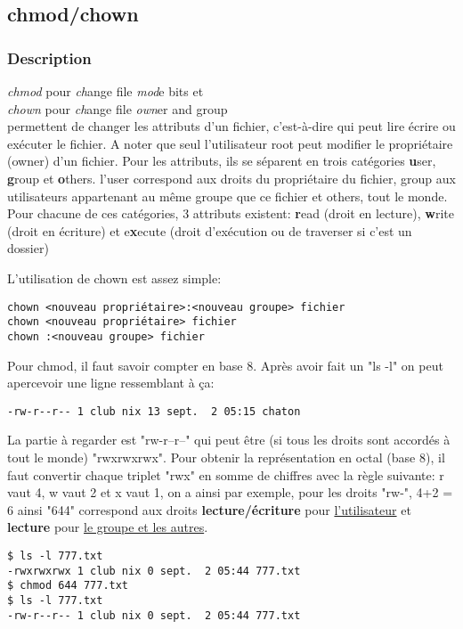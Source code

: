 \subsection*{chmod/chown}
\subsubsection*{Description}
\noindent \emph{chmod} pour \emph{ch}ange file \emph{mod}e bits et\\
\emph{chown} pour  \emph{ch}ange file \emph{own}er and group\\
permettent de changer les attributs d'un fichier, c'est-à-dire qui peut lire écrire ou exécuter le fichier.
A noter que seul l'utilisateur root peut modifier le propriétaire (owner) d'un fichier.
Pour les attributs, ils se séparent en trois catégories \textbf{u}ser, \textbf{g}roup et \textbf{o}thers.
l'user correspond aux droits du propriétaire du fichier, group aux utilisateurs appartenant au même groupe que ce fichier et others, tout le monde.\\
Pour chacune de ces catégories, 3 attributs existent: \textbf{r}ead (droit en lecture), \textbf{w}rite (droit en écriture) et e\textbf{x}ecute (droit d’exécution ou de traverser si c'est un dossier)

\noindent L'utilisation de chown est assez simple:
\begin{lstlisting}
chown <nouveau propriétaire>:<nouveau groupe> fichier
chown <nouveau propriétaire> fichier
chown :<nouveau groupe> fichier
\end{lstlisting}

\noindent
Pour chmod, il faut savoir compter en base 8. Après avoir fait un "ls -l" on peut apercevoir une ligne ressemblant à ça:
\begin{lstlisting}
-rw-r--r-- 1 club nix 13 sept.  2 05:15 chaton
\end{lstlisting}
La partie à regarder est "rw-r--r--" qui peut être (si tous les droits sont accordés à tout le monde) "rwxrwxrwx".
Pour obtenir la représentation en octal (base 8), il faut convertir chaque triplet "rwx" en somme de chiffres avec la règle suivante:
r vaut 4, w vaut 2 et x vaut 1, on a ainsi par exemple, pour les droits "rw-", 4+2 = 6
ainsi "644" correspond aux droits \textbf{lecture/écriture} pour \underline{l'utilisateur} et \textbf{lecture} pour \underline{le groupe et les autres}.

\begin{lstlisting}
$ ls -l 777.txt
-rwxrwxrwx 1 club nix 0 sept.  2 05:44 777.txt
$ chmod 644 777.txt
$ ls -l 777.txt
-rw-r--r-- 1 club nix 0 sept.  2 05:44 777.txt
\end{lstlisting}


